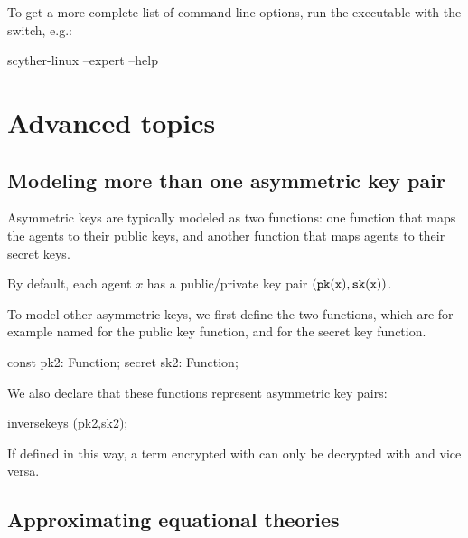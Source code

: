 \documentclass{book}
\begin{document}
To get a more complete list of command-line options, run the executable with the  switch, e.g.:
\begin{screen}
scyther-linux --expert --help
\end{screen}

\chapter{Advanced topics}
\label{sec:advanced}

\section{Modeling more than one asymmetric key pair}
\label{adv:asymmetric}

Asymmetric keys are typically modeled as two functions: one function that maps
the agents to their public keys, and another function that maps agents to their
secret keys. 

By default, each agent $x$ has a public/private key pair
$({\tt pk(x)},{\tt sk(x)})$.

To model other asymmetric keys, we first define the two functions, which are
for example named  for the public key function, and  for the secret
key function.
\begin{spdl}
const pk2: Function;
secret sk2: Function;
\end{spdl}

We also declare that these functions represent asymmetric key pairs:
\begin{spdl}
inversekeys (pk2,sk2);
\end{spdl}

If defined in this way, a term encrypted with  can only be
decrypted with  and vice versa.

\section{Approximating equational theories}

\end{document}

